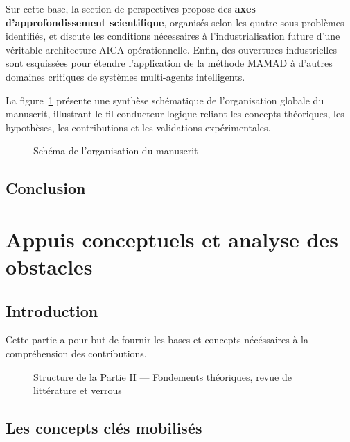 \documentclass[ twoside,openright,titlepage,numbers=noenddot,headinclude,%
                footinclude=true,cleardoublepage=empty,abstractoff, %
                BCOR=5mm,paper=a4,fontsize=11pt,%
                french,american,%
                ]{scrreprt}
\begin{document}
Sur cette base, la section de perspectives propose des \textbf{axes d'approfondissement scientifique}, organisés selon les quatre sous-problèmes identifiés, et discute les conditions nécessaires à l'industrialisation future d'une véritable architecture AICA opérationnelle. Enfin, des ouvertures industrielles sont esquissées pour étendre l'application de la méthode MAMAD à d'autres domaines critiques de systèmes multi-agents intelligents.

\medskip

La figure~\ref{fig:organisation_manuscrit} présente une synthèse schématique de l'organisation globale du manuscrit, illustrant le fil conducteur logique reliant les concepts théoriques, les hypothèses, les contributions et les validations expérimentales.

\begin{figure}[h!]
    \centering
    \resizebox{\textwidth}{!}{%
        
    }
    \caption{Schéma de l'organisation du manuscrit}
    \label{fig:organisation_manuscrit}
\end{figure}

\chapter*{Conclusion}



\part{Appuis conceptuels et analyse des obstacles}

\chapter*{Introduction}
Cette partie a pour but de fournir les bases et concepts nécéssaires à la compréhension des contributions.

\begin{figure}[h!]
    \centering
    
    \caption{Structure de la Partie II — Fondements théoriques, revue de littérature et verrous}
\end{figure}

\chapter{Les concepts clés mobilisés}
\end{document}
